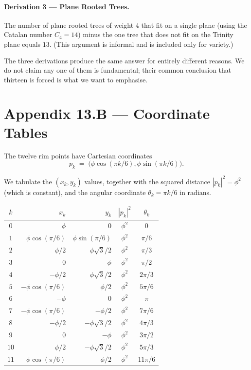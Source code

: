 \paragraph{Derivation 3 --- Plane Rooted Trees.}
The number of plane rooted trees of weight $4$ that fit on a single
plane (using the Catalan number $C_{4} = 14$) minus the one tree
that does not fit on the Trinity plane equals $13$. (This argument
is informal and is included only for variety.)

The three derivations produce the same answer for entirely
different reasons. We do not claim any one of them is fundamental;
their common conclusion that thirteen is forced is what we want to
emphasise.

\section*{Appendix 13.B --- Coordinate Tables}
\label{sec:13-appB}

The twelve rim points have Cartesian coordinates
\[
  p_{k} \;=\; \bigl( \phi \cos(\pi k / 6), \phi \sin(\pi k / 6) \bigr).
\]

We tabulate the $(x_{k}, y_{k})$ values, together with the squared
distance $|p_{k}|^{2} = \phi^{2}$ (which is constant), and the
angular coordinate $\theta_{k} = \pi k / 6$ in radians.

\begin{center}
\begin{tabular}{c|rr|c|c}
$k$ & $x_{k}$ & $y_{k}$ & $|p_{k}|^{2}$ & $\theta_{k}$ \\\hline
$0$  & $\phi$              & $0$               & $\phi^{2}$ & $0$     \\
$1$  & $\phi \cos(\pi/6)$  & $\phi \sin(\pi/6)$ & $\phi^{2}$ & $\pi/6$ \\
$2$  & $\phi/2$            & $\phi\sqrt{3}/2$  & $\phi^{2}$ & $\pi/3$ \\
$3$  & $0$                 & $\phi$            & $\phi^{2}$ & $\pi/2$ \\
$4$  & $-\phi/2$           & $\phi\sqrt{3}/2$  & $\phi^{2}$ & $2\pi/3$\\
$5$  & $-\phi\cos(\pi/6)$  & $\phi/2$          & $\phi^{2}$ & $5\pi/6$\\
$6$  & $-\phi$             & $0$               & $\phi^{2}$ & $\pi$   \\
$7$  & $-\phi\cos(\pi/6)$  & $-\phi/2$         & $\phi^{2}$ & $7\pi/6$\\
$8$  & $-\phi/2$           & $-\phi\sqrt{3}/2$ & $\phi^{2}$ & $4\pi/3$\\
$9$  & $0$                 & $-\phi$           & $\phi^{2}$ & $3\pi/2$\\
$10$ & $\phi/2$            & $-\phi\sqrt{3}/2$ & $\phi^{2}$ & $5\pi/3$\\
$11$ & $\phi\cos(\pi/6)$   & $-\phi/2$         & $\phi^{2}$ & $11\pi/6$\\
\end{tabular}
\end{center}

